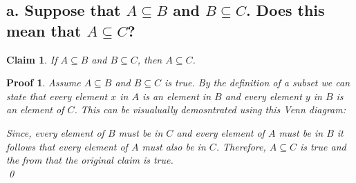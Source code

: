 \documentclass{article}
\newtheorem*{claim}{Claim}
\newtheorem*{poof}{Proof}
\begin{document}
\subsection*{a. Suppose that $A \subseteq B$ and $B \subseteq C$. Does this mean that $A \subseteq C$?}
\begin{claim}
    If $A \subseteq B$ and $B \subseteq C$, then $A \subseteq C$.
\end{claim}
\begin{poof}
    Assume $A \subseteq B$ and $B \subseteq C$ is true. By the definition of a subset we can state that every element $x$ in $A$ is an element in $B$ and every element $y$ in $B$ is an element of $C$. This can be visualually demosntrated using this Venn diagram:
    \begin{center}
    \end{center}
    Since, every element of $B$ must be in $C$ and every element of $A$ must be in $B$ it follows that every element of $A$ must also be in $C$. Therefore, $A \subseteq C$ is true and the  from that the original claim is true. \\
    \qed
\end{poof}
\end{document}
